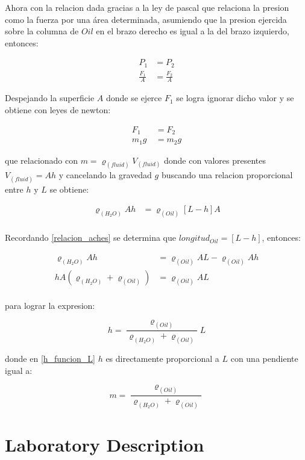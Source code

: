 Ahora con la relacion dada gracias a la ley de pascal que relaciona la presion como la fuerza por una área determinada, asumiendo que la presion ejercida sobre la columna de $Oil$ en el brazo derecho es igual a la del brazo izquierdo, entonces:

\begin{align*}
P_1 &= P_2\\
\frac{F_1}{A} &=  \frac{F_2}{A} 
\end{align*}

Despejando la superficie $A$ donde se ejerce $F_1$ se logra ignorar dicho valor y se obtiene con leyes de newton:

\begin{align*}
F_1 &= F_2\\
m_1g\ &=  m_2g 
\end{align*}

que relacionado con $m = \varrho_{(fluid)}V_{(fluid)}$ donde con valores presentes $V_{(fluid)} = Ah$ y cancelando la gravedad $g$ buscando una relacion proporcional entre $h$ y $L$ se obtiene:

\begin{align*}
\varrho_{(H_{2}O)}Ah &= \varrho_{(Oil)}[L-h]A\\
\end{align*}

Recordando \ref{relacion_aches} se determina que $longitud_{Oil} = [L-h]$, entonces: 

\begin{align*}
\varrho_{(H_{2}O)}Ah &= \varrho_{(Oil)}AL - \varrho_{(Oil)}Ah\\
hA(\varrho_{(H_{2}O)} + \varrho_{(Oil)}) &= \varrho_{(Oil)}AL\\
\end{align*}

para lograr la expresion:

\begin{equation}
\label{h_funcion_L}
h = \frac{\varrho_{(Oil)}}{\varrho_{(H_{2}O)} + \varrho_{(Oil)}} L     
\end{equation}

donde en \ref{h_funcion_L} $h$ es directamente proporcional a $L$ con una pendiente igual a:

\begin{equation}
\label{pendiente_function}
m = \frac{\varrho_{(Oil)}}{\varrho_{(H_{2}O)} + \varrho_{(Oil)}}     
\end{equation}

\section{Laboratory Description}

